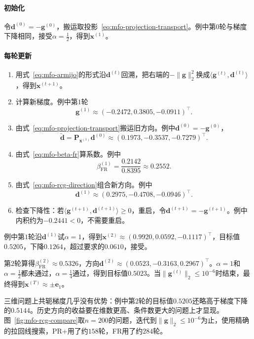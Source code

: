 \paragraph{初始化}
令$\bm{d}^{(0)}=-\bm{g}^{(0)}$，搬运取投影~\eqref{eq:mfo-projection-transport}。例中第$0$轮与梯度下降相同，接受$\alpha=\tfrac12$，得到$\bm{x}^{(1)}$。

\paragraph{每轮更新}
\begin{enumerate}
 \item 用式~\eqref{eq:mfo-armijo}的形式沿$\bm{d}^{(t)}$回溯，把右端的$-\lVert\bm{g}\rVert_2^2$换成$\langle\bm{g}^{(t)},\bm{d}^{(t)}\rangle$，得到$\bm{x}^{(t+1)}$。

 \item 计算新梯度。例中第$1$轮
 \[
  \bm{g}^{(1)}\approx(-0.2472,0.3805,-0.0911)^\top.
 \]

 \item 由式~\eqref{eq:mfo-projection-transport}搬运旧方向。例中$\bm{d}^{(0)}=-\bm{g}^{(0)}$，
 \[
  \widetilde{\bm{d}}=\bm{P}_{\bm{x}^{(1)}}\bm{d}^{(0)}\approx(0.1973,-0.3537,-0.7279)^\top.
 \]

 \item 由式~\eqref{eq:mfo-beta-fr}算系数。例中
 \[
  \beta_{\mathrm{FR}}^{(1)}=\frac{0.2142}{0.8395}\approx0.2552.
 \]

 \item 由式~\eqref{eq:mfo-rcg-direction}组合新方向。例中
 \[
  \bm{d}^{(1)}\approx(0.2975,-0.4708,-0.0946)^\top.
 \]

 \item 检查下降性：若$\langle\bm{g}^{(t+1)},\bm{d}^{(t+1)}\rangle\geq0$，重启，令$\bm{d}^{(t+1)}=-\bm{g}^{(t+1)}$。例中内积约为$-0.2441<0$，不需要重启。
\end{enumerate}

例中第$1$轮沿$\bm{d}^{(1)}$试$\alpha=1$，得到$\bm{x}^{(2)}\approx(0.9920,0.0592,-0.1117)^\top$，目标值$0.5205$，下降$0.1264$，超过要求的$0.0610$，接受。

第$2$轮算得$\beta^{(2)}_{\mathrm{FR}}\approx0.5326$，方向$\bm{d}^{(2)}\approx(0.0523,-0.3163,0.2967)^\top$。$\alpha=1$和$\alpha=\tfrac12$都未通过，$\alpha=\tfrac14$通过，得到目标值$0.5023$。当$\lVert\bm{g}^{(t)}\rVert_2\leq10^{-6}$时结束，最终得到$\bm{x}^{(T)}\approx\pm\bm{e}_1$。

三维问题上共轭梯度几乎没有优势：例中第$2$轮的目标值$0.5205$还略高于梯度下降的$0.5144$。历史方向的收益要在维数更高、条件数更大的问题上才显现。图~\ref{fig:mfo-rcg-compare}取$n=200$的问题，迭代到$\lVert\bm{g}\rVert_2\leq10^{-6}$为止，使用精确的拉回线搜索，PR+用了约$158$轮，FR用了约$284$轮。

